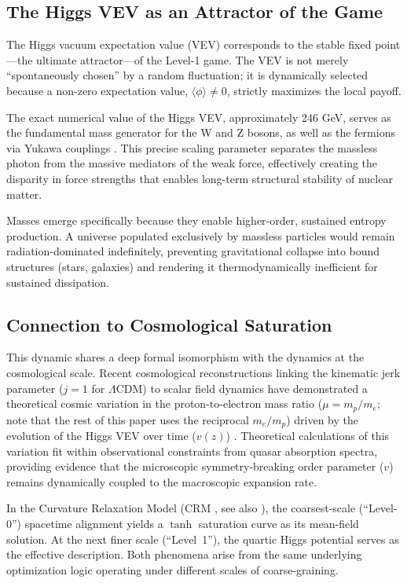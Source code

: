 \documentclass[12pt,a4paper]{article}
\theoremstyle{remark}
\begin{document}
\subsection{The Higgs VEV as an Attractor of the Game}

The Higgs vacuum expectation value (VEV) corresponds to the stable fixed point---the ultimate attractor---of the Level-1 game. The VEV is not merely ``spontaneously chosen'' by a random fluctuation; it is dynamically selected because a non-zero expectation value, $\langle\phi\rangle \neq 0$, strictly maximizes the local payoff.

The exact numerical value of the Higgs VEV, approximately 246 GeV, serves as the fundamental mass generator for the W and Z bosons, as well as the fermions via Yukawa couplings \citep{HiggsVEV}. This precise scaling parameter separates the massless photon from the massive mediators of the weak force, effectively creating the disparity in force strengths that enables long-term structural stability of nuclear matter.

Masses emerge specifically because they enable higher-order, sustained entropy production. A universe populated exclusively by massless particles would remain radiation-dominated indefinitely, preventing gravitational collapse into bound structures (stars, galaxies) and rendering it thermodynamically inefficient for sustained dissipation.

\subsection{Connection to Cosmological Saturation}

This dynamic shares a deep formal isomorphism with the dynamics at the cosmological scale. Recent cosmological reconstructions linking the kinematic jerk parameter ($j = 1$ for $\Lambda$CDM) to scalar field dynamics have demonstrated a theoretical cosmic variation in the proton-to-electron mass ratio ($\mu = m_p/m_e$; note that the rest of this paper uses the reciprocal $m_e/m_p$) driven by the evolution of the Higgs VEV over time ($v(z)$) \citep{HiggsVEV2024}. Theoretical calculations of this variation fit within observational constraints from quasar absorption spectra, providing evidence that the microscopic symmetry-breaking order parameter ($v$) remains dynamically coupled to the macroscopic expansion rate.

In the Curvature Relaxation Model (CRM \cite{GeigerCRM2026}, see also \cite{FST-Unified2026}), the coarsest-scale (``Level-0'') spacetime alignment yields a $\tanh$ saturation curve as its mean-field solution. At the next finer scale (``Level~1''), the quartic Higgs potential serves as the effective description. Both phenomena arise from the same underlying optimization logic operating under different scales of coarse-graining.
\end{document}
